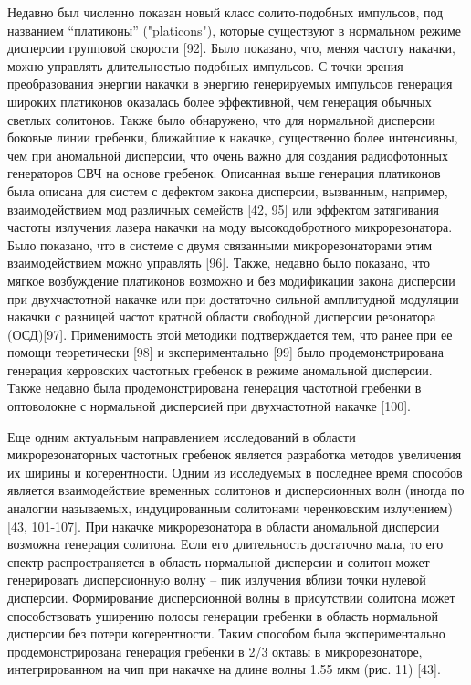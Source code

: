 Недавно был численно показан новый класс солито-подобных импульсов, под названием “платиконы” ("platicons"), которые существуют в нормальном режиме дисперсии групповой скорости [92]. Было показано, что, меняя частоту накачки, можно управлять длительностью подобных импульсов. С точки зрения преобразования энергии накачки в энергию генерируемых импульсов генерация широких платиконов оказалась более эффективной, чем генерация обычных светлых солитонов. Также было обнаружено, что для нормальной дисперсии боковые линии гребенки, ближайшие к накачке, существенно более интенсивны, чем при аномальной дисперсии, что очень важно для создания радиофотонных генераторов СВЧ на основе гребенок. Описанная выше генерация платиконов была описана для систем с дефектом закона дисперсии, вызванным, например, взаимодействием мод различных семейств [42, 95] или эффектом затягивания частоты излучения лазера накачки на моду высокодобротного микрорезонатора. Было показано, что в системе с двумя связанными микрорезонаторами этим взаимодействием можно управлять [96]. Также, недавно было показано, что мягкое возбуждение платиконов возможно и без модификации закона дисперсии при двухчастотной накачке или при достаточно сильной амплитудной модуляции накачки с разницей частот кратной области свободной дисперсии резонатора (ОСД)[97]. Применимость этой методики подтверждается тем, что ранее при ее помощи теоретически [98] и экспериментально [99] было продемонстрирована генерация керровских частотных гребенок в режиме аномальной дисперсии. Также недавно была продемонстрирована генерация частотной гребенки в оптоволокне с нормальной дисперсией при двухчастотной накачке [100].


Еще одним актуальным направлением исследований в области микрорезонаторных частотных гребенок является разработка методов увеличения их ширины и когерентности. Одним из исследуемых в последнее время способов является взаимодействие временных солитонов и дисперсионных волн (иногда по аналогии называемых, индуцированным  солитонами черенковским излучением) [43, 101-107]. При накачке микрорезонатора в области аномальной дисперсии возможна генерация солитона. Если его длительность достаточно мала, то его спектр распространяется в область нормальной дисперсии и солитон может генерировать дисперсионную волну – пик излучения вблизи точки нулевой дисперсии. Формирование дисперсионной волны в присутствии солитона может способствовать уширению полосы генерации гребенки в область нормальной дисперсии без потери когерентности. Таким способом была экспериментально продемонстрирована генерация гребенки в 2/3 октавы в микрорезонаторе, интегрированном на чип при накачке на длине волны 1.55 мкм (рис. 11) [43].


